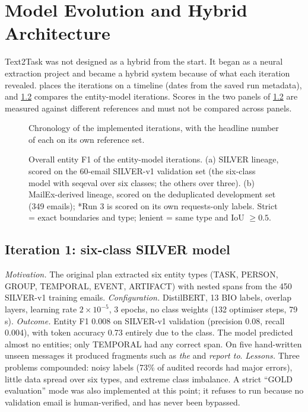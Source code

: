 \chapter{Model Evolution and Hybrid Architecture}
\label{ch:evolution}

Text2Task was not designed as a hybrid from the start. It began as a neural extraction project and became a hybrid system because of what each iteration revealed.  places the iterations on a timeline (dates from the saved run metadata), and \cref{fig:iterations} compares the entity-model iterations. Scores in the two panels of \cref{fig:iterations} are measured against different references and must not be compared across panels.

\begin{figure}[t]
\centering
{}
\caption[Model and system evolution]{Chronology of the implemented iterations, with the headline number of each on its own reference set.}
\label{fig:evolution}
\end{figure}

\begin{figure}[t]
\centering
{}
\caption[Entity model iterations]{Overall entity F1 of the entity-model iterations. (a) SILVER lineage, scored on the 60-email SILVER-v1 validation set (the six-class model with seqeval over six classes; the others over three). (b) MailEx-derived lineage, scored on the deduplicated development set (349 emails); *Run 3 is scored on its own requests-only labels. Strict = exact boundaries and type; lenient = same type and IoU $\ge 0.5$.}
\label{fig:iterations}
\end{figure}

\section{Iteration 1: six-class SILVER model}
\textit{Motivation.} The original plan extracted six entity types (TASK, PERSON, GROUP, TEMPORAL, EVENT, ARTIFACT) with nested spans from the 450 SILVER-v1 training emails.
\textit{Configuration.} DistilBERT, 13 BIO labels, overlap layers, learning rate $2\times10^{-5}$, 3 epochs, no class weights (132 optimiser steps, 79 s).
\textit{Outcome.} Entity F1 0.008 on SILVER-v1 validation (precision 0.08, recall 0.004), with token accuracy 0.73 entirely due to the  class. The model predicted almost no entities; only TEMPORAL had any correct span. On five hand-written unseen messages it produced fragments such as \emph{the} and \emph{report to}.
\textit{Lessons.} Three problems compounded: noisy labels (73\% of audited records had major errors), little data spread over six types, and extreme class imbalance. A strict ``GOLD evaluation'' mode was also implemented at this point; it refuses to run because no validation email is human-verified, and has never been bypassed.

